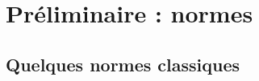 
\section{Préliminaire : normes} \label{sec:Multivar-Norme}

\subsection{Quelques normes classiques} 

